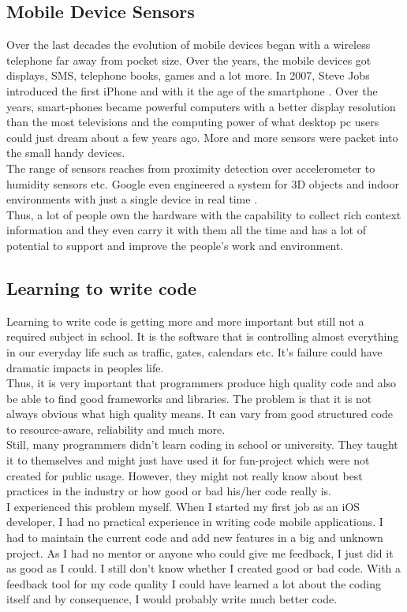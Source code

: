 \subsection{Mobile Device Sensors}
Over the last decades the evolution of mobile devices began with a wireless telephone far away from pocket size. Over the years, the mobile devices got displays, SMS, telephone books, games and a lot more. In 2007, Steve Jobs introduced the first iPhone and with it the age of the smartphone  \cite{laugesen2010factors}. Over the years, smart-phones became powerful computers with a better display resolution than the most televisions and the computing power of what desktop pc users could just dream about a few years ago. More and more sensors were packet into the small handy devices.\\
The range of sensors reaches from proximity detection over accelerometer to humidity sensors etc. Google even engineered a system for 3D objects and indoor environments with just a single device in real time \cite{schops20153d}.\\
Thus, a lot of people own the hardware with the capability to collect rich context information and they even carry it with them all the time and has a lot of potential to support and improve the people's work and environment.

\subsection{Learning to write code}
Learning to write code is getting more and more important but still not a required subject in school. It is the software that is controlling almost everything in our everyday life such as traffic, gates, calendars etc. It's failure could have dramatic impacts in peoples life.\\
Thus, it is very important that programmers produce high quality code and also be able to find good frameworks and libraries. The problem is that it is not always obvious what high quality means. It can vary from good structured code to resource-aware, reliability and much more.
\\Still, many programmers didn't learn coding in school or university. They taught it to themselves and might just have used it for fun-project which were not created for public usage. However, they might not really know about best practices in the industry or how good or bad his/her code really is.\\
I experienced this problem myself.
When I started my first job as an iOS developer, I had no practical experience in writing code mobile applications. I had to maintain the current code and add new features in a big and unknown project. As I had no mentor or anyone who could give me feedback, I just did it as good as I could. I still don't know whether I created good or bad code. With a feedback tool for my code quality I could have learned a lot about the coding itself and by consequence, I would probably write much better code.

